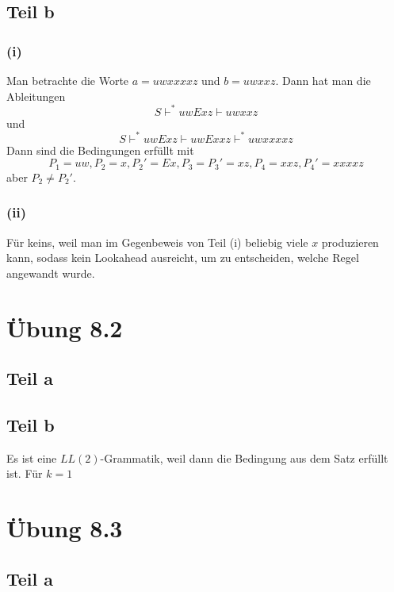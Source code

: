 \documentclass[10pt,a4paper]{article}
\begin{document}
\subsection{Teil b}

\subsubsection{(i)}

Man betrachte die Worte $a = uwxxxxz$ und $b = uwxxz$.
Dann hat man die Ableitungen
\begin{equation}
  S \vdash^{*} uwExz \vdash uwxxz
\end{equation}
und
\begin{equation}
  S \vdash^{*} uwExz \vdash uwExxz \vdash^{*} uwxxxxz
\end{equation}
Dann sind die Bedingungen erfüllt mit
\begin{equation}
  P_{1} = uw, P_{2} = x, P_{2}' = Ex, P_{3} = P_{3}' = xz, P_{4} = xxz, P_{4}' = xxxxz
\end{equation}
aber $P_{2} \ne P_{2}'$.

\subsubsection{(ii)}

Für keins, weil man im Gegenbeweis von Teil (i) beliebig viele $x$ produzieren kann, sodass kein Lookahead ausreicht, um zu entscheiden, welche Regel angewandt wurde.

\section{Übung 8.2}

\subsection{Teil a}

\subsection{Teil b}

Es ist eine $LL(2)$-Grammatik, weil dann die Bedingung aus dem Satz erfüllt ist.
Für $k = 1$

\section{Übung 8.3}

\subsection{Teil a}
\end{document}
